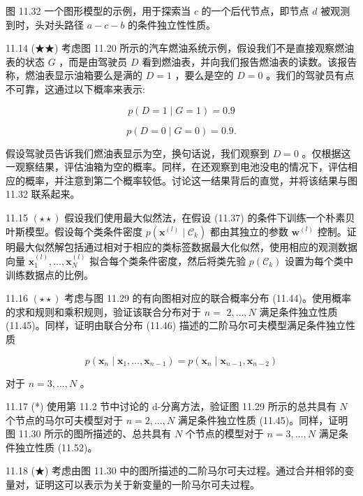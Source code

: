\documentclass[10pt]{report}
\begin{document}
图 11.32 一个图形模型的示例，用于探索当 \(c\) 的一个后代节点，即节点 \(d\) 被观测到时，头对头路径 \(a - c - b\) 的条件独立性性质。

11.14 (★★) 考虑图 11.20 所示的汽车燃油系统示例，假设我们不是直接观察燃油表的状态 \(G\) ，而是由驾驶员 \(D\) 看到燃油表，并向我们报告燃油表的读数。该报告称，燃油表显示油箱要么是满的 \(D = 1\) ，要么是空的 \(D = 0\) 。我们的驾驶员有点不可靠，这通过以下概率来表示:

\[
p\left( {D = 1 \mid  G = 1}\right)  = {0.9} \tag{11.50}
\]

\[
p\left( {D = 0 \mid  G = 0}\right)  = {0.9}. \tag{11.51}
\]

假设驾驶员告诉我们燃油表显示为空，换句话说，我们观察到 \(D = 0\) 。仅根据这一观察结果，评估油箱为空的概率。同样，在还观察到电池没电的情况下，评估相应的概率，并注意到第二个概率较低。讨论这一结果背后的直觉，并将该结果与图 11.32 联系起来。

11.15 \(\left( {\star  \star  }\right)\) 假设我们使用最大似然法，在假设 (11.37) 的条件下训练一个朴素贝叶斯模型。假设每个类条件密度 \(p\left( {{\mathbf{x}}^{\left( l\right) } \mid  {\mathcal{C}}_{k}}\right)\) 都由其独立的参数 \({\mathbf{w}}^{\left( l\right) }\) 控制。证明最大似然解包括通过相对于相应的类标签数据最大化似然，使用相应的观测数据向量 \({\mathbf{x}}_{1}^{\left( l\right) },\ldots ,{\mathbf{x}}_{N}^{\left( l\right) }\) 拟合每个类条件密度，然后将类先验 \(p\left( {\mathcal{C}}_{k}\right)\) 设置为每个类中训练数据点的比例。

11.16 \(\left( {\star  \star  }\right)\) 考虑与图 11.29 的有向图相对应的联合概率分布 (11.44)。使用概率的求和规则和乘积规则，验证该联合分布对于 \(n =\)  \(2,\ldots ,N\) 满足条件独立性质 (11.45)。同样，证明由联合分布 (11.46) 描述的二阶马尔可夫模型满足条件独立性质

\[
p\left( {{\mathbf{x}}_{n} \mid  {\mathbf{x}}_{1},\ldots ,{\mathbf{x}}_{n - 1}}\right)  = p\left( {{\mathbf{x}}_{n} \mid  {\mathbf{x}}_{n - 1},{\mathbf{x}}_{n - 2}}\right)  \tag{11.52}
\]

对于 \(n = 3,\ldots ,N\) 。

11.17 (*) 使用第 11.2 节中讨论的 d-分离方法，验证图 11.29 所示的总共具有 \(N\) 个节点的马尔可夫模型对于 \(n = 2,\ldots ,N\) 满足条件独立性质 (11.45)。同样，证明图 11.30 所示的图所描述的、总共具有 \(N\) 个节点的模型对于 \(n = 3,\ldots ,N\) 满足条件独立性质 (11.52)。

11.18 (★) 考虑由图 11.30 中的图所描述的二阶马尔可夫过程。通过合并相邻的变量对，证明这可以表示为关于新变量的一阶马尔可夫过程。
\end{document}
